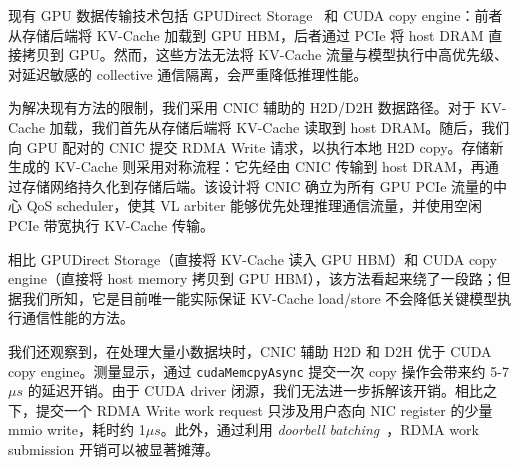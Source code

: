 现有 GPU 数据传输技术包括 GPUDirect Storage~\cite{nvidia2026gds} 和 CUDA copy engine：前者从存储后端将 KV-Cache 加载到 GPU HBM，后者通过 PCIe 将 host DRAM 直接拷贝到 GPU。然而，这些方法无法将 KV-Cache 流量与模型执行中高优先级、对延迟敏感的 collective 通信隔离，会严重降低推理性能。

为解决现有方法的限制，我们采用 CNIC 辅助的 H2D/D2H 数据路径。对于 KV-Cache 加载，我们首先从存储后端将 KV-Cache 读取到 host DRAM。随后，我们向 GPU 配对的 CNIC 提交 RDMA Write 请求，以执行本地 H2D copy。存储新生成的 KV-Cache 则采用对称流程：它先经由 CNIC 传输到 host DRAM，再通过存储网络持久化到存储后端。该设计将 CNIC 确立为所有 GPU PCIe 流量的中心 QoS scheduler，使其 VL arbiter 能够优先处理推理通信流量，并使用空闲 PCIe 带宽执行 KV-Cache 传输。

相比 GPUDirect Storage（直接将 KV-Cache 读入 GPU HBM）和 CUDA copy engine（直接将 host memory 拷贝到 GPU HBM），该方法看起来绕了一段路；但据我们所知，它是目前唯一能实际保证 KV-Cache load/store 不会降低关键模型执行通信性能的方法。

我们还观察到，在处理大量小数据块时，CNIC 辅助 H2D 和 D2H 优于 CUDA copy engine。测量显示，通过 \texttt{cudaMemcpyAsync} 提交一次 copy 操作会带来约 {5}-{7}$\mu s$ 的延迟开销。由于 CUDA driver 闭源，我们无法进一步拆解该开销。相比之下，提交一个 RDMA Write work request 只涉及用户态向 NIC register 的少量 mmio write，耗时约 {1}$\mu s$。此外，通过利用 \emph{doorbell batching}~\cite{kalia2016design}，RDMA work submission 开销可以被显著摊薄。

